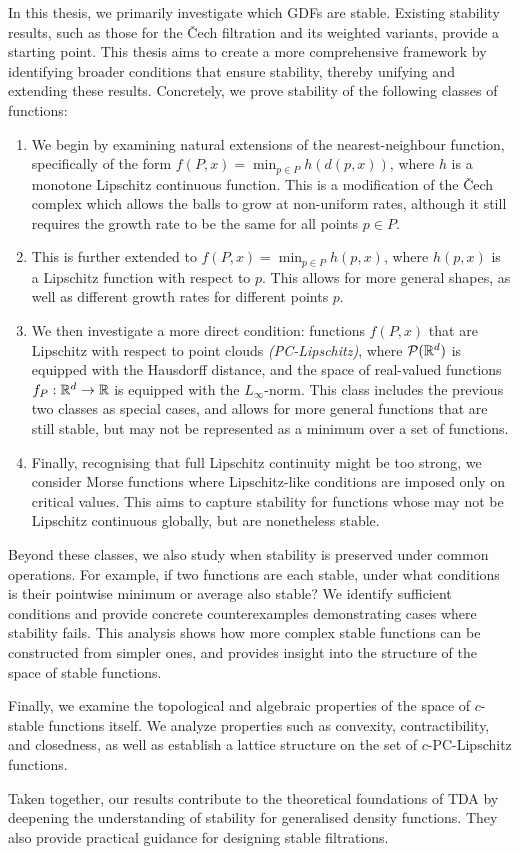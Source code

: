 In this thesis, we primarily investigate which GDFs are stable. Existing
stability results, such as those for the \v{C}ech filtration and its weighted
variants, provide a starting point. This thesis aims to create a more
comprehensive framework by identifying broader conditions that ensure stability,
thereby unifying and extending these results. Concretely, we prove stability of
the following classes of functions:
\begin{enumerate}
    \item We begin by examining natural extensions of the nearest-neighbour
        function, specifically of the form $f(P, x) = \min_{p \in P} h(d(p,
        x))$, where $h$ is a monotone Lipschitz continuous function. This
        is a modification of the \v{C}ech complex which allows the balls to grow
        at non-uniform rates, although it still requires the growth rate to be
        the same for all points $p \in P$.
    \item This is further extended to $f(P, x) = \min_{p \in P} h(p, x)$, where
        $h(p, x)$ is a Lipschitz function with respect to $p$. This allows for
        more general shapes, as well as different growth rates for different
        points $p$.
    \item We then investigate a more direct condition: functions $f(P, x)$ that
        are Lipschitz with respect to point clouds \emph{(PC-Lipschitz)}, where
        $\mathcal{P}(\mathbb{R}^d)$ is equipped with the Hausdorff distance, and the
        space of real-valued functions $f_P : \mathbb{R}^d \to \mathbb{R}$ is equipped with the
        $L_\infty$-norm. This class includes the previous two classes as
        special cases, and allows for more general functions that are still
        stable, but may not be represented as a minimum over a set of
        functions.
    \item Finally, recognising that full Lipschitz continuity might be too
        strong, we consider Morse functions where Lipschitz-like conditions are
        imposed only on critical values. This aims to capture stability for
        functions whose may not be Lipschitz continuous globally, but are
        nonetheless stable.
\end{enumerate}

Beyond these classes, we also study when stability is preserved under common
operations. For example, if two functions are each stable, under what conditions
is their pointwise minimum or average also stable? We identify sufficient
conditions and provide concrete counterexamples demonstrating cases where
stability fails. This analysis shows how more complex stable functions can be
constructed from simpler ones, and provides insight into the structure of the
space of stable functions.

Finally, we examine the topological and algebraic properties of the space of
$c$-stable functions itself. We analyze properties such as convexity,
contractibility, and closedness, as well as establish a lattice structure on the
set of $c$-PC-Lipschitz functions.

Taken together, our results contribute to the theoretical foundations of TDA by
deepening the understanding of stability for generalised density functions. They
also provide practical guidance for designing stable filtrations.